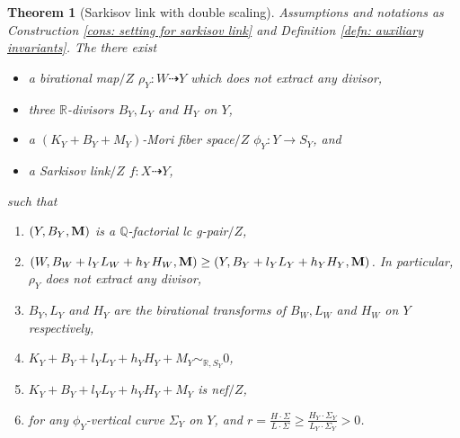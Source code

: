 \documentclass[11pt]{amsart}
\numberwithin{equation}{section}
\newcommand{\Mm}{{\bf{M}}}
\newcommand{\Qq}{\mathbb{Q}}
\newcommand{\Rr}{\mathbb{R}}
\newtheorem{thm}{Theorem}[section]
\theoremstyle{definition}
\theoremstyle{definition}
\theoremstyle{definition}
\begin{document}
\begin{thm}[Sarkisov link with double scaling]\label{thm: scaling sarkisov}
Assumptions and notations as Construction \ref{cons: setting for sarkisov link} and Definition \ref{defn: auxiliary invariants}. The there exist
\begin{itemize}
    \item a birational map$/Z$ $\rho_Y: W\dashrightarrow Y$ which does not extract any divisor,
    \item three $\Rr$-divisors $B_Y,L_Y$ and $H_Y$ on $Y$,
    \item a $(K_Y+B_Y+M_Y)$-Mori fiber space$/Z$ $\phi_Y:Y\rightarrow S_Y$, and
    \item a Sarkisov link$/Z$ $f: X\dashrightarrow Y$,
\end{itemize}
such that
\begin{enumerate}
\item $(Y,B_Y,\Mm)$ is a $\Qq$-factorial lc g-pair$/Z$,
    \item $(W,B_W+l_YL_W+h_YH_W,\Mm)\geq (Y,B_Y+l_YL_Y+h_YH_Y,\Mm)$. In particular, $\rho_Y$ does not extract any divisor,
    \item $B_Y,L_Y$ and $H_Y$ are the birational transforms of $B_W,L_W$ and $H_W$ on $Y$ respectively,
    \item $K_Y+B_Y+l_YL_Y+h_YH_Y+M_Y\sim_{\Rr,S_Y}0$, 
    \item $K_Y+B_Y+l_YL_Y+h_YH_Y+M_Y$ is nef$/Z$, 
    \item for any $\phi_Y$-vertical curve $\Sigma_Y$ on $Y$, and $r=\frac{H\cdot\Sigma}{L\cdot\Sigma}\geq\frac{H_Y\cdot\Sigma_Y}{L_Y\cdot\Sigma_Y}>0$.
\end{enumerate}
\end{thm}
\end{document}
